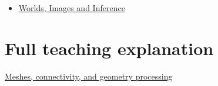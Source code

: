 \begin{itemize}
\tightlist
\item
  \href{Continuous\%20Notes/University\%20-\%20Worlds,\%20Images\%20and\%20Inference\%20-\%20Graphics,\%20Vision\%20and\%20Photography}{Worlds, Images and Inference}
\end{itemize}

\section{Full teaching explanation}\label{appendix-1dd4ad54ca57-full-teaching-explanation}

\href{Continuous\%20Notes/University\%20-\%20Worlds,\%20Images\%20and\%20Inference\%20-\%20Graphics,\%20Vision\%20and\%20Photography\#Meshes,\%20connectivity,\%20and\%20geometry\%20processing}{Meshes, connectivity, and geometry processing}
